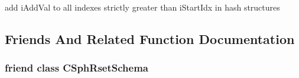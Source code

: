 add i\-Add\-Val to all indexes strictly greater than i\-Start\-Idx in hash structures 



\subsection{Friends And Related Function Documentation}
\hypertarget{classCSphSchema_ae9fc32f1e11e9afd5d44b12b60e68c65}{
\subsubsection[{C\-Sph\-Rset\-Schema}]{\setlength{\rightskip}{0pt plus 5cm}friend class {\bf C\-Sph\-Rset\-Schema}\hspace{0.3cm}{\ttfamily [friend]}}}\label{classCSphSchema_ae9fc32f1e11e9afd5d44b12b60e68c65}


